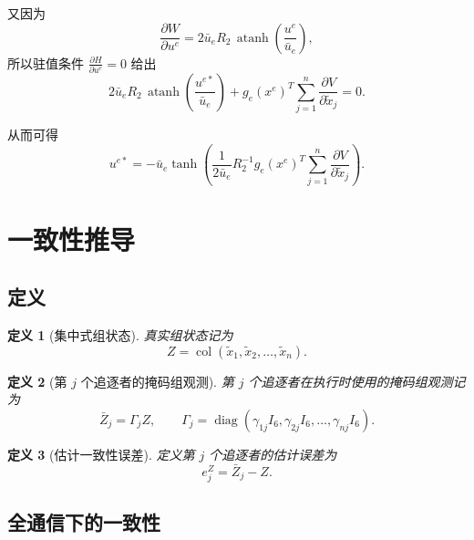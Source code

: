 \documentclass[12pt,a4paper]{ctexart}
\newtheorem{definition}{定义}
\begin{document}
又因为
\begin{equation}
\frac{\partial W}{\partial u^e}
=
2\bar u_e R_2\,\operatorname{atanh}\!\left(\frac{u^e}{\bar u_e}\right),
\end{equation}
所以驻值条件 $\frac{\partial H}{\partial u^e}=0$ 给出
\begin{equation}
2\bar u_e R_2\,\operatorname{atanh}\!\left(\frac{u^{e*}}{\bar u_e}\right)
+
g_e(x^e)^T\sum_{j=1}^{n}\frac{\partial V}{\partial \tilde x_j}
=0.
\end{equation}

从而可得
\begin{equation}
u^{e*}
=
-\bar u_e
\tanh\!\left(
\frac{1}{2\bar u_e}
R_2^{-1}
g_e(x^e)^T
\sum_{j=1}^{n}\frac{\partial V}{\partial \tilde x_j}
\right).
\end{equation}

\section{一致性推导}

\subsection{定义}

\begin{definition}[集中式组状态]
真实组状态记为
\begin{equation}
Z=\operatorname{col}(\tilde x_1,\tilde x_2,\dots,\tilde x_n).
\end{equation}
\end{definition}

\begin{definition}[第 $j$ 个追逐者的掩码组观测]
第 $j$ 个追逐者在执行时使用的掩码组观测记为
\begin{equation}
\bar Z_j=\Gamma_j Z,
\qquad
\Gamma_j=\operatorname{diag}(\gamma_{1j}I_6,\gamma_{2j}I_6,\dots,\gamma_{nj}I_6).
\end{equation}
\end{definition}

\begin{definition}[估计一致性误差]
定义第 $j$ 个追逐者的估计误差为
\begin{equation}
e_j^Z=\bar Z_j-Z.
\end{equation}
\end{definition}

\subsection{全通信下的一致性}
\end{document}

